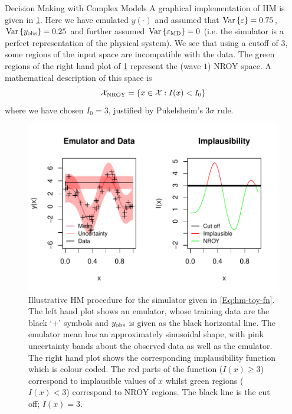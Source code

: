 \begin{chapter}{Decision Making with Complex Models \label{Chap:optimisation}}
A graphical implementation of HM is given in \cref{Fig:example-hm-graph}. Here we have emulated $y(\cdot)$ and assumed that $\mathrm{Var}\,\{\varepsilon\} = 0.75$, $\mathrm{Var}\,\{y_{\text{obs}}\} = 0.25$ and further assumed $\mathrm{Var}\,\{\varepsilon_{\text{MD}} \} = 0$ (i.e. the simulator is a perfect representation of the physical system). We see that using a cutoff of $3$, some regions of the input space are incompatible with the data. The green regions of the right hand plot of \cref{Fig:example-hm-graph} represent the (wave $1$) NROY space. A mathematical description of this space is
\begin{equation}
 \mathcal{X}_{\text{NROY}} = \{ x \in \mathcal{X} : I(x) < I_0 \}
\end{equation}
where we have chosen $I_0 = 3$, justified by Pukelsheim's $3\sigma$ rule.
\begin{figure}
	\centering
	\includegraphics{fig-optim/implaus1.pdf}
	\caption{Illustrative HM procedure for the simulator given in \cref{Eq:hm-toy-fn}. The left hand plot shows an emulator, whose training data are the black `$+$' symbols and $y_{\text{obs}}$ is given as the black horizontal line. The emulator mean has an approximately sinusoidal shape, with pink uncertainty bands about the observed data as well as the emulator. The right hand plot shows the corresponding implausibility function which is colour coded. The red parts of the function ($I(x) \geq 3$) correspond to implausible values of $x$ whilst green regions ($I(x) < 3$) correspond to NROY regions. The black line is the cut off; $I(x) = 3$. \label{Fig:example-hm-graph}
}
\end{figure}

\end{chapter}
